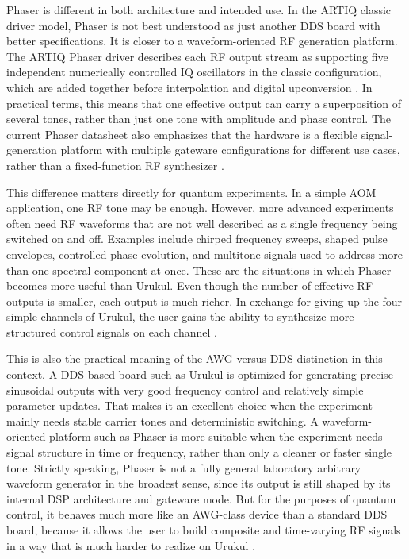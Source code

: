 Phaser is different in both architecture and intended use. In the ARTIQ classic driver model, Phaser is not best understood as just another DDS board with better specifications. It is closer to a waveform-oriented RF generation platform. The ARTIQ Phaser driver describes each RF output stream as supporting five independent numerically controlled IQ oscillators in the classic configuration, which are added together before interpolation and digital upconversion \cite{artiq_phaser_module, artiq_phaser_legacy}. In practical terms, this means that one effective output can carry a superposition of several tones, rather than just one tone with amplitude and phase control. The current  Phaser datasheet also emphasizes that the hardware is a flexible signal-generation platform with multiple gateware configurations for different use cases, rather than a fixed-function RF synthesizer \cite{phaser_datasheet}.

This difference matters directly for quantum experiments. In a simple AOM application, one RF tone may be enough. However, more advanced experiments often need RF waveforms that are not well described as a single frequency being switched on and off. Examples include chirped frequency sweeps, shaped pulse envelopes, controlled phase evolution, and multitone signals used to address more than one spectral component at once. These are the situations in which Phaser becomes more useful than Urukul. Even though the number of effective RF outputs is smaller, each output is much richer. In exchange for giving up the four simple channels of Urukul, the user gains the ability to synthesize more structured control signals on each channel \cite{artiq_phaser_module, phaser_datasheet}.

This is also the practical meaning of the AWG versus DDS distinction in this context. A DDS-based board such as Urukul is optimized for generating precise sinusoidal outputs with very good frequency control and relatively simple parameter updates. That makes it an excellent choice when the experiment mainly needs stable carrier tones and deterministic switching. A waveform-oriented platform such as Phaser is more suitable when the experiment needs signal structure in time or frequency, rather than only a cleaner or faster single tone. Strictly speaking, Phaser is not a fully general laboratory arbitrary waveform generator in the broadest sense, since its output is still shaped by its internal DSP architecture and gateware mode. But for the purposes of quantum control, it behaves much more like an AWG-class device than a standard DDS board, because it allows the user to build composite and time-varying RF signals in a way that is much harder to realize on Urukul \cite{artiq_phaser_module, phaser_datasheet, dac34h84}.

